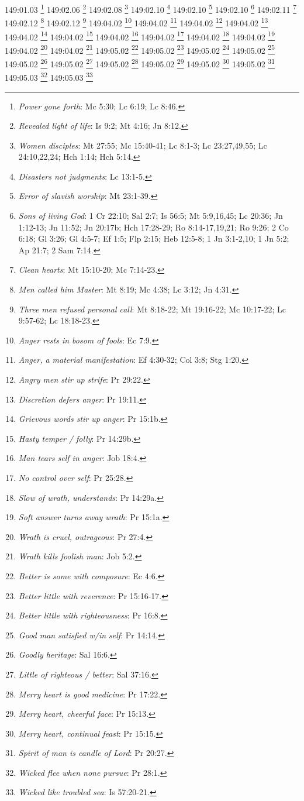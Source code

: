 {{{{{{{{{{{{{{{{{{{{{{{{{{149:01.03 \footnote{\textit{Power gone forth}: Mc 5:30; Lc 6:19; Lc 8:46.}
149:02.06 \footnote{\textit{Revealed light of life}: Is 9:2; Mt 4:16; Jn 8:12.}
149:02.08 \footnote{\textit{Women disciples}: Mt 27:55; Mc 15:40-41; Lc 8:1-3; Lc 23:27,49,55; Lc 24:10,22,24; Hch 1:14; Hch 5:14.}
149:02.10 \footnote{\textit{Disasters not judgments}: Lc 13:1-5.}
149:02.10 \footnote{\textit{Error of slavish worship}: Mt 23:1-39.}
149:02.10 \footnote{\textit{Sons of living God}: 1 Cr 22:10; Sal 2:7; Is 56:5; Mt 5:9,16,45; Lc 20:36; Jn 1:12-13; Jn 11:52; Jn 20:17b; Hch 17:28-29; Ro 8:14-17,19,21; Ro 9:26; 2 Co 6:18; Gl 3:26; Gl 4:5-7; Ef 1:5; Flp 2:15; Heb 12:5-8; 1 Jn 3:1-2,10; 1 Jn 5:2; Ap 21:7; 2 Sam 7:14.}
149:02.11 \footnote{\textit{Clean hearts}: Mt 15:10-20; Mc 7:14-23.}
149:02.12 \footnote{\textit{Men called him Master}: Mt 8:19; Mc 4:38; Lc 3:12; Jn 4:31.}
149:02.12 \footnote{\textit{Three men refused personal call}: Mt 8:18-22; Mt 19:16-22; Mc 10:17-22; Lc 9:57-62; Lc 18:18-23.}
149:04.02 \footnote{\textit{Anger rests in bosom of fools}: Ec 7:9.}
149:04.02 \footnote{\textit{Anger, a material manifestation}: Ef 4:30-32; Col 3:8; Stg 1:20.}
149:04.02 \footnote{\textit{Angry men stir up strife}: Pr 29:22.}
149:04.02 \footnote{\textit{Discretion defers anger}: Pr 19:11.}
149:04.02 \footnote{\textit{Grievous words stir up anger}: Pr 15:1b.}
149:04.02 \footnote{\textit{Hasty temper / folly}: Pr 14:29b.}
149:04.02 \footnote{\textit{Man tears self in anger}: Job 18:4.}
149:04.02 \footnote{\textit{No control over self}: Pr 25:28.}
149:04.02 \footnote{\textit{Slow of wrath, understands}: Pr 14:29a.}
149:04.02 \footnote{\textit{Soft answer turns away wrath}: Pr 15:1a.}
149:04.02 \footnote{\textit{Wrath is cruel, outrageous}: Pr 27:4.}
149:04.02 \footnote{\textit{Wrath kills foolish man}: Job 5:2.}
149:05.02 \footnote{\textit{Better is some with composure}: Ec 4:6.}
149:05.02 \footnote{\textit{Better little with reverence}: Pr 15:16-17.}
149:05.02 \footnote{\textit{Better little with righteousness}: Pr 16:8.}
149:05.02 \footnote{\textit{Good man satisfied w/in self}: Pr 14:14.}
149:05.02 \footnote{\textit{Goodly heritage}: Sal 16:6.}
149:05.02 \footnote{\textit{Little of righteous / better}: Sal 37:16.}
149:05.02 \footnote{\textit{Merry heart is good medicine}: Pr 17:22.}
149:05.02 \footnote{\textit{Merry heart, cheerful face}: Pr 15:13.}
149:05.02 \footnote{\textit{Merry heart, continual feast}: Pr 15:15.}
149:05.02 \footnote{\textit{Spirit of man is candle of Lord}: Pr 20:27.}
149:05.03 \footnote{\textit{Wicked flee when none pursue}: Pr 28:1.}
149:05.03 \footnote{\textit{Wicked like troubled sea}: Is 57:20-21.}
}}}}}}}}}}}}}}}}}}}}}}}}}}
